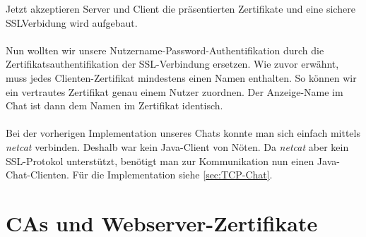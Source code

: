 \documentclass[a4paper,12bpt]{scrartcl}
\begin{document}
Jetzt akzeptieren Server und Client die präsentierten Zertifikate und eine sichere SSLVerbidung
wird aufgebaut.\\\\
Nun wollten wir unsere Nutzername-Password-Authentifikation durch die Zertifikatsauthentifikation
der SSL-Verbindung ersetzen. Wie zuvor erwähnt, muss jedes Clienten-Zertifikat mindestens einen
Namen enthalten. So können wir ein vertrautes Zertifikat genau einem Nutzer zuordnen.
Der Anzeige-Name im Chat ist dann dem Namen im Zertifikat identisch.\\\\
Bei der vorherigen Implementation unseres Chats konnte man sich einfach mittels \textit{netcat}
verbinden. Deshalb war kein Java-Client von Nöten. Da \textit{netcat} aber kein SSL-Protokol
unterstützt, benötigt man zur Kommunikation nun einen Java-Chat-Clienten. Für die Implementation
siehe \ref{sec:TCP-Chat}.

\section{CAs und Webserver-Zertifikate}
\label{sec:certs}
\end{document}
